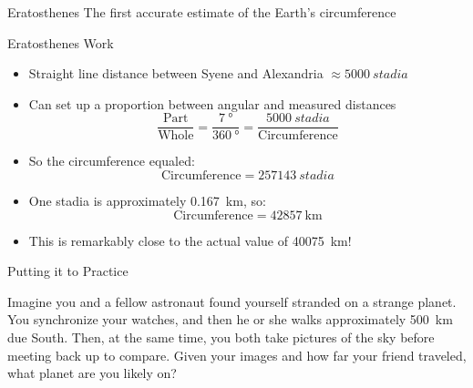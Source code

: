 \documentclass[pdf, aspectratio=169]{beamer}
\begin{document}
\begin{frame}{Eratosthenes}
  The first accurate estimate of the Earth's circumference
  \begin{center}
  \end{center}
\end{frame}

\begin{frame}{Eratosthenes Work}
  \begin{itemize}
	\item Straight line distance between Syene and Alexandria $\approx\SI{5000}{stadia}$
	\item Can set up a proportion between angular and measured distances
	  \[\frac{\text{Part}}{\text{Whole}} = \frac{\SI{7}{\degree}}{\SI{360}{\degree}} = \frac{\SI{5000}{stadia}}{\text{Circumference}}\]
	\item So the circumference equaled:
	  \[\text{Circumference} = \SI{257143}{stadia}\]
	\item One stadia is approximately \SI{0.167}{\kilo\meter}, so:
	  \[\text{Circumference} = \SI{42857}{\kilo\meter}\]
	\item This is remarkably close to the actual value of \SI{40075}{\kilo\meter}!
  \end{itemize}
\end{frame}

\begin{frame}{Putting it to Practice}
  \begin{example}
	Imagine you and a fellow astronaut found yourself stranded on a strange planet. You synchronize your watches, and then he or she walks approximately \SI{500}{\kilo\meter} due South. Then, at the same time, you both take pictures of the sky before meeting back up to compare. Given your images and how far your friend traveled, what planet are you likely on?
  \end{example}
\end{frame}
\end{document}
